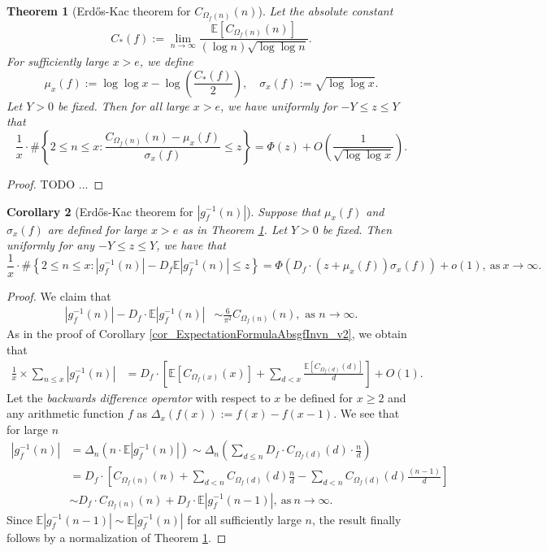 \documentclass[11pt,reqno,a4letter]{article}
\numberwithin{figure}{section}
\numberwithin{table}{section}
\theoremstyle{plain}
\newtheorem{theorem}{Theorem}
\newtheorem{cor}[theorem]{Corollary}
\numberwithin{theorem}{section}
\theoremstyle{definition}
\begin{document}
\begin{theorem}[Erd\H{o}s-Kac theorem for $C_{\Omega_f(n)}(n)$]
\label{theorem_ErdosKacThmAnalog_COmegafnn_v1}
Let the absolute constant 
\[
C_{\ast}(f) := \lim_{n \rightarrow \infty} \frac{\mathbb{E}[C_{\Omega_f(n)}(n)]}{(\log n) \sqrt{\log\log n}}. 
\]
For sufficiently large $x > e$, we define 
\[
\mu_x(f) := \log\log x - \log\left(\frac{C_{\ast}(f)}{2}\right), \quad \sigma_x(f) := \sqrt{\log\log x}. 
\]
Let $Y > 0$ be fixed. 
Then for all large $x > e$, we have uniformly for $-Y \leq z \leq Y$ that 
\[
\frac{1}{x} \cdot \#\left\{2 \leq n \leq x: 
     \frac{C_{\Omega_f(n)}(n) - \mu_x(f)}{\sigma_x(f)} \leq z\right\} = 
     \Phi\left(z\right) + O\left(\frac{1}{\sqrt{\log\log x}}\right). 
\]
\end{theorem}
\begin{proof}
TODO ... 
\end{proof}

\begin{cor}[Erd\H{o}s-Kac theorem for $|g_f^{-1}(n)|$]
Suppose that $\mu_x(f)$ and $\sigma_x(f)$ are defined for large 
$x > e$ as in Theorem \ref{theorem_ErdosKacThmAnalog_COmegafnn_v1}. 
Let $Y > 0$ be fixed. Then uniformly for any $-Y \leq z \leq Y$, we have that 
\[
\frac{1}{x} \cdot \#\left\{2 \leq n \leq x: |g_f^{-1}(n)| - 
     D_f \mathbb{E}|g_f^{-1}(n)| \leq z\right\} = 
     \Phi\left(D_f \cdot (z+\mu_x(f)) \sigma_x(f)\right) + 
     o(1), \mathrm{\ as\ } x \rightarrow \infty. 
\]
\end{cor}
\begin{proof}
We claim that 
\begin{align*} 
|g_f^{-1}(n)| - D_f \cdot \mathbb{E}|g_f^{-1}(n)| & \sim \frac{6}{\pi^2} C_{\Omega_f(n)}(n), 
     \text{\ as\ } n \rightarrow \infty. 
\end{align*} 
As in the proof of Corollary \ref{cor_ExpectationFormulaAbsgfInvn_v2}, 
we obtain that 
\begin{align*} 
\frac{1}{x} \times \sum_{n \leq x} |g_f^{-1}(n)| & = 
     D_f \cdot \left[\mathbb{E}[C_{\Omega_f(x)}(x)] + \sum_{d<x} 
     \frac{\mathbb{E}[C_{\Omega_f(d)}(d)]}{d}\right] + O(1). 
\end{align*} 
Let the \emph{backwards difference operator} with respect to $x$ 
be defined for $x \geq 2$ and any arithmetic function $f$ as 
$\Delta_x(f(x)) := f(x) - f(x-1)$. 
We see that for large $n$ 
\begin{align*} 
|g_f^{-1}(n)| & = \Delta_n(n \cdot \mathbb{E}|g_f^{-1}(n)|) 
     \sim \Delta_n\left(\sum_{d \leq n} D_f \cdot C_{\Omega_f(d)}(d) \cdot \frac{n}{d}\right) \\ 
     & = D_f \cdot \left[C_{\Omega_f(n)}(n) + \sum_{d < n} C_{\Omega_f(d)}(d) \frac{n}{d} - 
     \sum_{d<n} C_{\Omega_f(d)}(d) \frac{(n-1)}{d}\right] \\ 
     & \sim D_f \cdot C_{\Omega_f(n)}(n) + D_f \cdot \mathbb{E}|g_f^{-1}(n-1)|, 
     \mathrm{\ as\ } n \rightarrow \infty. 
\end{align*} 
Since $\mathbb{E}|g_f^{-1}(n-1)| \sim \mathbb{E}|g_f^{-1}(n)|$ 
for all sufficiently large $n$, 
the result finally follows by a normalization of 
Theorem \ref{theorem_ErdosKacThmAnalog_COmegafnn_v1}. 
\end{proof}
\end{document}
